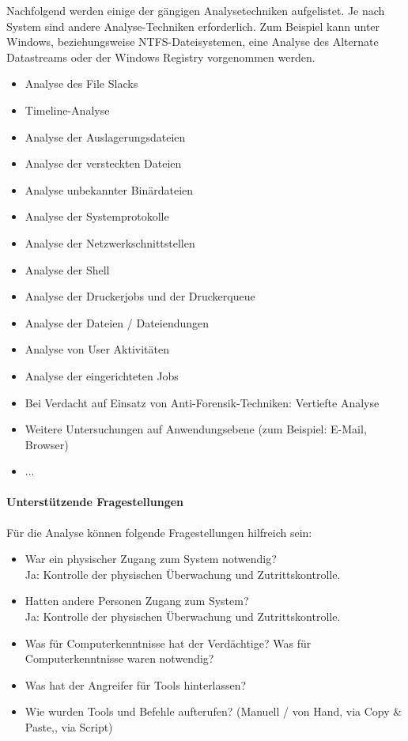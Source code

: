 Nachfolgend werden einige der gängigen Analysetechniken aufgelistet. Je nach System sind andere Analyse-Techniken erforderlich. Zum Beispiel kann unter Windows, beziehungsweise NTFS-Dateisystemen, eine Analyse des Alternate Datastreams oder der Windows Registry vorgenommen werden.

\begin{itemize}
\item Analyse des File Slacks
\item Timeline-Analyse
\item Analyse der Auslagerungsdateien
\item Analyse der versteckten Dateien
\item Analyse unbekannter Binärdateien
\item Analyse der Systemprotokolle
\item Analyse der Netzwerkschnittstellen
\item Analyse der Shell
\item Analyse der Druckerjobs und der Druckerqueue
\item Analyse der Dateien / Dateiendungen
\item Analyse von User Aktivitäten
\item Analyse der eingerichteten Jobs
\item Bei Verdacht auf Einsatz von Anti-Forensik-Techniken: Vertiefte Analyse
\item Weitere Untersuchungen auf Anwendungsebene (zum Beispiel: E-Mail, Browser)
\item ...
\end{itemize}

\paragraph{Unterstützende Fragestellungen}
Für die Analyse können folgende Fragestellungen hilfreich sein:
\begin{itemize}
\item War ein physischer Zugang zum System notwendig?\\
Ja: Kontrolle der physischen Überwachung und Zutrittskontrolle.
\item Hatten andere Personen Zugang zum System?\\
Ja: Kontrolle der physischen Überwachung und Zutrittskontrolle.
\item Was für Computerkenntnisse hat der Verdächtige? Was für Computerkenntnisse waren notwendig?
\item Was hat der Angreifer für Tools hinterlassen?
\item Wie wurden Tools und Befehle aufterufen? (Manuell / von Hand, via Copy \& Paste,, via Script)
\end{itemize}

